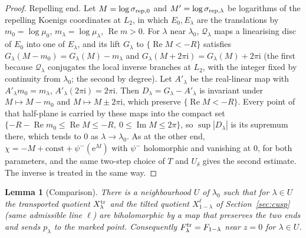 \documentclass[11pt]{amsart}
\newtheorem{lemma}[theorem]{Lemma}
\theoremstyle{definition}
\newcommand{\eee}{\mathrm{e}}
\newcommand{\ii}{\mathrm{i}}
\begin{document}
\begin{proof}
Repelling end.  Let $M=\log\sigma_{{\rm rep},0}$ and $M'=\log\sigma_{{\rm rep},\lambda}$ be logarithms of the
repelling Koenigs coordinates at $L_2$, in which $E_0,E_\lambda$ are the
translations by $m_0=\log\mu_0$, $m_\lambda=\log\mu_\lambda$, $\operatorname{Re}m>0$.  For $\lambda$ near $\lambda_0$, $\mathcal Q_\lambda$
maps a linearising disc of $E_0$ into one of $E_\lambda$, and its lift $G_\lambda$ to
$\{\operatorname{Re}M<-R\}$ satisfies $G_\lambda(M-m_0)=G_\lambda(M)-m_\lambda$ and
$G_\lambda(M+2\pi\ii)=G_\lambda(M)+2\pi\ii$ (the first because $\mathcal Q_\lambda$ conjugates the local
inverse branches at $L_2$, with the integer fixed by continuity from $\lambda_0$; the
second by degree).  Let
$A'_\lambda$ be the real-linear map with $A'_\lambda m_0=m_\lambda$, $A'_\lambda(2\pi\ii)=2\pi\ii$.  Then
$D_\lambda=G_\lambda-A'_\lambda$ is invariant under $M\mapsto M-m_0$ and $M\mapsto M\pm2\pi\ii$, which
preserve $\{\operatorname{Re}M<-R\}$.  Every point of that half-plane is carried by these
maps into the compact set $\{-R-\operatorname{Re}m_0\le\operatorname{Re}M\le-R,\ 0\le\operatorname{Im}M\le2\pi\}$, so
$\sup|D_\lambda|$ is its supremum there, which tends to $0$ as $\lambda\to\lambda_0$.  As at the
other end, $\chi=-M+\mathrm{const}+\psi^-(\eee^{M})$ with $\psi^-$ holomorphic and vanishing
at $0$, for both parameters, and the same two-step choice of $T$ and $U_\delta$
gives the second estimate.  The inverse is treated in the same way.
\end{proof}

\begin{lemma}[Comparison]\label{lem:global-compare}
There is a neighbourhood $U$ of $\lambda_0$ such that for $\lambda\in U$ the transported
quotient $X^{\rm tr}_\lambda$ and the tilted quotient $X^\ell_{1-\lambda}$ of
Section~\ref{sec:cusp} (same admissible line $\ell$) are biholomorphic by a
map that preserves the two ends and sends $p_\lambda$ to the marked point.
Consequently $F^{\rm tr}_\lambda=F_{1-\lambda}$ near $z=0$ for $\lambda\in U$.
\end{lemma}
\end{document}
